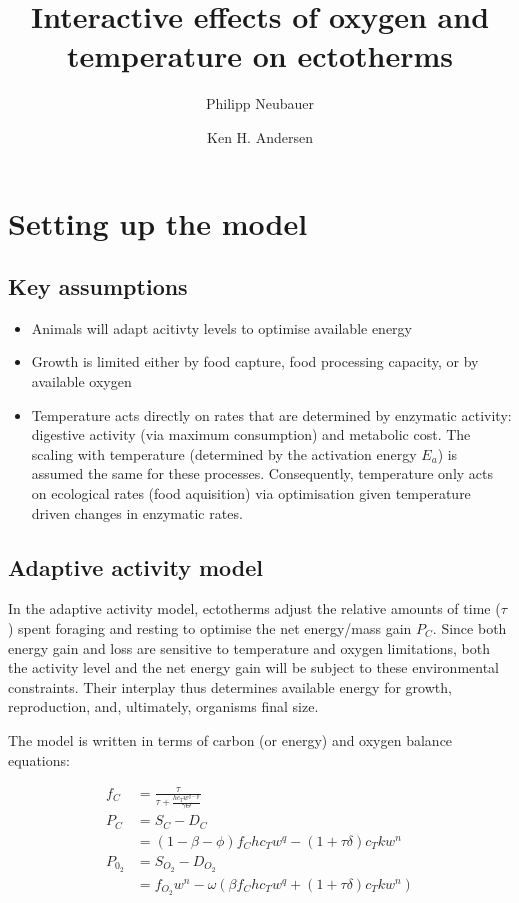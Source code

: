 \documentclass{article}
\title{Interactive effects of oxygen and temperature on ectotherms}
\author{Philipp Neubauer \and Ken H. Andersen}
\begin{document}
\maketitle

\section{Setting up the model}

\subsection{Key assumptions}
\begin{itemize}
\item Animals will adapt acitivty levels to optimise available energy
\item Growth is limited either by food capture, food processing capacity, or by available oxygen
\item Temperature acts directly on rates that are determined by enzymatic activity: digestive activity (via maximum consumption) and metabolic cost. The scaling with temperature (determined by the activation energy $E_a$) is assumed the same for these processes. Consequently, temperature only acts on ecological rates (food aquisition) via optimisation given temperature driven changes in enzymatic rates.


\end{itemize}

\subsection{Adaptive activity model}

In the adaptive activity model, ectotherms adjust the relative amounts of time ($\tau$) spent foraging and resting to optimise the net energy/mass gain $P_C$. Since both energy gain and loss are sensitive to temperature and oxygen limitations, both the activity level and the net energy gain will be subject to these environmental constraints. Their interplay thus determines available energy for growth, reproduction, and, ultimately, organisms final size.

The model is written in terms of carbon (or energy) and oxygen balance equations:

\begin{align}
f_C &= \frac{\tau }{\tau  + \frac{h c_T w^{q-p}}{\gamma\Theta} } \\
P_C &= S_C - D_C \\
  &=(1-\beta-\phi)f_C h c_T w^q  -(1+\tau \delta)c_T k w^n \\ 
P_{0_2} &= S_{O_2} - D_{O_2} \\
        &= f_{O_2}w^n - \omega(\beta f_C h c_T w^q +(1+\tau \delta) c_T k w^n)
\end{align}
\end{document}
